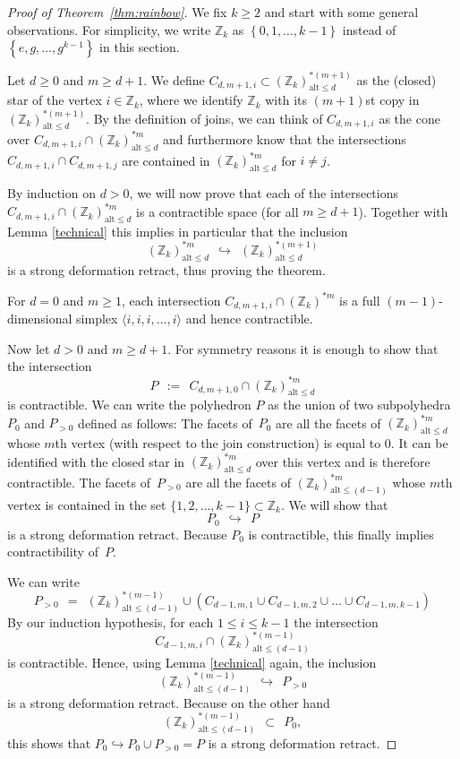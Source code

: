 \documentclass[11pt,a4paper,draft]{article}
\newcommand{\Z}{{\mathbb Z}}
\newcommand\set[1]{\left\{#1\right\}}
\newcommand\simp[1]{\langle#1\rangle}
\newcommand\alt{{\mathrm{alt}}}
\theoremstyle{definition}
\begin{document}
\begin{proof}[Proof of Theorem~\ref{thm:rainbow}] We fix $k \geq 2$ and start
with some  general observations.
For simplicity, we write $\Z_k$ as $\set{0,1,\dots,k-1}$
instead of $\set{e,g,\dots,g^{k-1}}$ in this section.

Let  $d \geq 0$ and $m \geq d+1$.  We define  $C_{d,m+1,i} \subset (\Z_k)^{*(m+1)}_{\alt \le d}$ as the
(closed) star of the vertex $i \in \Z_k$, where we identify  $\Z_k$ with
its $(m+1)$st copy in $(\Z_k)^{*(m+1)}_{\alt \le d}$. By the definition
of  joins, we can think of $C_{d,m+1,i}$ as
the cone over $C_{d,m+1,i} \cap (\Z_k)^{*m}_{\alt \le d}$ and furthermore know that the intersections
$C_{d,m+1,i} \cap C_{d,m+1,j}$ are contained in $(\Z_k)^{*m}_{\alt \le d}$ for $i \neq j$.

By induction on $d > 0$, we will now prove that each of the intersections
$C_{d,m+1,i} \cap (\Z_k)^{*m}_{\alt \le d}$ is a contractible space (for all $m \geq d+1$). Together with
Lemma \ref{technical} this implies in particular that the inclusion
\[
    (\Z_k)^{*m}_{\alt \le d}\ \ \hookrightarrow\ \  (\Z_k)^{*(m+1)}_{\alt \le d}
\]
is a strong deformation retract, thus proving the theorem.

For $d=0$ and $m \geq 1$, each intersection $C_{d,m+1,i} \cap (\Z_k)^{*m}$ is a full
$(m-1)$-dimensional simplex  $\simp{i,i,i,\ldots, i}$ and
hence contractible.

Now let $d > 0$ and  $m \geq d+1$. For symmetry reasons it is enough to show that the intersection
\[
    P\ \  :=\ \  C_{d,m+1,0} \cap (\Z_k)^{*m}_{\alt \le d}
\]
is contractible. We can write the polyhedron $P$ as the union of two subpolyhedra $P_0$ and $P_{>0}$ defined
as follows: The facets of~$P_0$ are all the facets of $(\Z_k)^{*m}_{\alt \le d}$ whose $m$th vertex
(with respect to the join construction) is equal to $0$. It can be identified with
the closed star in $(\Z_k)^{*m}_{\alt \le d}$ over this vertex and is therefore contractible.
The facets of~$P_{> 0}$ are all the facets of $(\Z_k)^{*m}_{\alt \le (d-1)}$ whose $m$th
vertex is contained in the set $\{1,2, \ldots, k-1\} \subset
\Z_k$. We will show that
\[
    P_0  \ \ \hookrightarrow \ \   P
\]
is a strong deformation retract. Because $P_0$ is contractible, this finally implies contractibility of~$P$.%

We can write
\[
   P_{> 0}\ \  =\ \  (\Z_k)^{*(m-1)}_{\alt \le (d-1)} \cup (C_{d-1,m,1} \cup C_{d-1,m,2} \cup \ldots \cup C_{d-1,m,k-1})
\]
By our induction hypothesis, for each $1 \leq i \leq k-1$ the
intersection
\[
  C_{d-1,m,i} \cap (\Z_k)^{*(m-1)}_{\alt \le (d-1)}
\]
is contractible. Hence, using Lemma \ref{technical} again,
the inclusion
\[
     (\Z_k)^{*(m-1)}_{\alt \le (d-1)}\ \  \hookrightarrow\ \  P_{>0}
\]
is a strong deformation retract. Because on the other hand
\[
    (\Z_k)^{*(m-1)}_{\alt \le (d-1)}\ \  \subset\ \  P_0 ,
\]
this shows that $P_0 \hookrightarrow P_0 \cup P_{ >0} =P $ is a strong deformation retract.
\end{proof}
\end{document}
